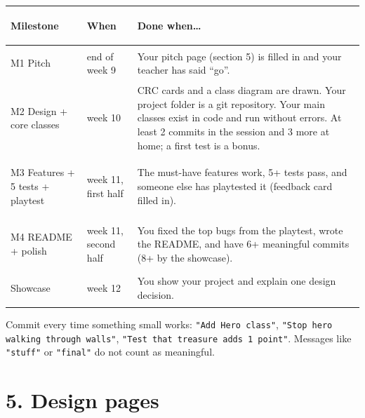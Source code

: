 \documentclass[level=3]{kidscode}
\begin{document}
\begin{longtable}{@{}>{\bfseries\raggedright\arraybackslash}p{3.0cm}>{\raggedright\arraybackslash}p{2.6cm}p{\dimexpr\linewidth-5.6cm-4\tabcolsep}@{}}
\toprule
\rowcolor{kcaccent!15} Milestone & When & Done when\ldots\\ \midrule\endhead
\bottomrule\endfoot
M1 Pitch & end of week 9 & Your pitch page (section 5) is filled in and your teacher has said
\enquote{go}.\\ \midrule
M2 Design + core classes & week 10 & CRC cards and a class diagram are drawn. Your project folder is a git
repository. Your main classes exist in code and run without errors. At least 2 commits in the
session and 3 more at home; a first test is a bonus.\\ \midrule
M3 Features + 5 tests + playtest & week 11, first half & The must-have features work, 5+ tests
pass, and someone else has playtested it (feedback card filled in).\\ \midrule
M4 README + polish & week 11, second half & You fixed the top bugs from the playtest, wrote the
README, and have 6+ meaningful commits (8+ by the showcase).\\ \midrule
Showcase & week 12 & You show your project and explain one design decision.\\
\end{longtable}

\begin{tip}
Commit every time something small works: \texttt{"Add Hero class"}, \texttt{"Stop hero walking
through walls"}, \texttt{"Test that treasure adds 1 point"}. Messages like \texttt{"stuff"} or
\texttt{"final"} do not count as meaningful.
\end{tip}

\section{5. Design pages}
\end{document}

